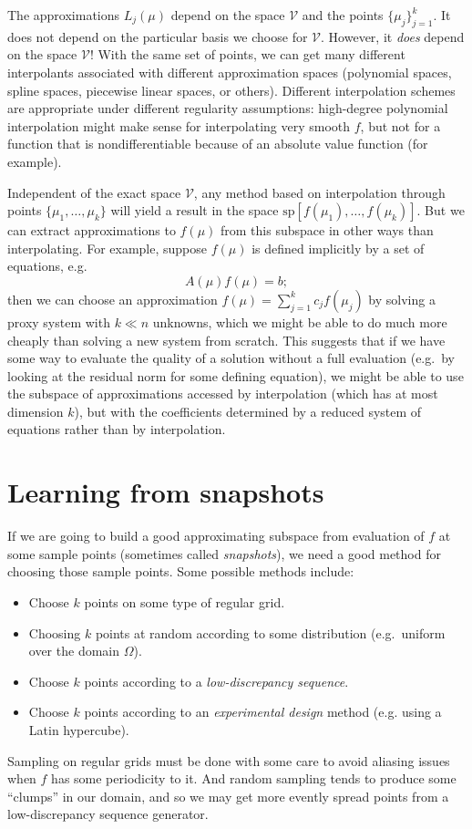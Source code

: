 \documentclass[12pt, leqno]{article} %
\begin{document}
The approximations $L_j(\mu)$ depend on the space $\mathcal{V}$ and
the points $\{\mu_j\}_{j=1}^k$.  It does not depend on the particular
basis we choose for $\mathcal{V}$.  However, it {\em does} depend on
the space $\mathcal{V}$!  With the same set of points, we can get many
different interpolants associated with different approximation spaces
(polynomial spaces, spline spaces, piecewise linear spaces, or
others).  Different interpolation schemes are appropriate under
different regularity assumptions: high-degree polynomial
interpolation might make sense for interpolating very smooth $f$,
but not for a function that is nondifferentiable because of an
absolute value function (for example).

Independent of the exact space $\mathcal{V}$, any method based on
interpolation through points $\{\mu_1, \ldots, \mu_k\}$ will yield a
result in the space $\mathrm{sp}[f(\mu_1), \ldots, f(\mu_k)]$.
But we can extract approximations to $f(\mu)$ from this subspace in
other ways than interpolating.  For example, suppose $f(\mu)$ is defined
implicitly by a set of equations, e.g.
\[
  A(\mu) f(\mu) = b;
\]
then we can choose an approximation $f(\mu) = \sum_{j=1}^k c_j f(\mu_j)$
by solving a proxy system with $k \ll n$ unknowns, which we might be
able to do much more cheaply than solving a new system from scratch.
This suggests that if we have some way to evaluate the quality of a
solution without a full evaluation (e.g.~by looking at the residual
norm for some defining equation), we might be able to use the
subspace of approximations accessed by interpolation
(which has at most dimension $k$), but with the coefficients
determined by a reduced system of equations rather than by interpolation.

\section{Learning from snapshots}

If we are going to build a good approximating subspace from evaluation
of $f$ at some sample points (sometimes called {\em snapshots}), we
need a good method for choosing those sample points.  Some possible
methods include:
\begin{itemize}
\item Choose $k$ points on some type of regular grid.
\item Choosing $k$ points at random according to some distribution
  (e.g.~uniform over the domain $\Omega$).
\item Choose $k$ points according to a {\em low-discrepancy sequence}.
\item Choose $k$ points according to an {\em experimental design}
  method (e.g. using a Latin hypercube).
\end{itemize}
Sampling on regular grids must be done with some care to avoid
aliasing issues when $f$ has some periodicity to it.  And random
sampling tends to produce some ``clumps'' in our domain, and so we may
get more evently spread points from a low-discrepancy sequence generator.
\end{document}
